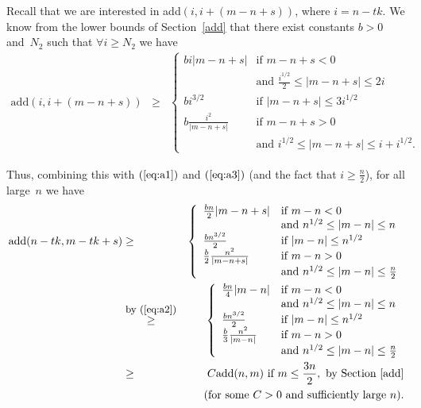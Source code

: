 \documentclass{article}
\newtheorem{Proof of Theorem}{Proof of Theorem}
\begin{document}
Recall that we are interested in add$(i,i+(m-n+s))$,
where $i=n-tk$.
We know from the lower bounds of Section~\ref{add} 
that there exist constants $b>0$ and~$N_{2}$ such that $\forall i \geq N_{2}$
we have
\begin{eqnarray*}
\textrm{add}(i,i\!+\!(m\!-\!n\!+\!s)) 
& \geq &
\left\{ \begin{array}{ll}
bi|m-n+s| & \textrm{if $m-n+s<0$} \\
& \textrm{and $\frac{i^{1/2}}{2} \leq |m-n+s| \leq 2i$} \\
bi^{3/2} & \textrm{if $|m-n+s| \leq 3i^{1/2}$} \\
b \frac{i^{2}}{|m-n+s|} & \textrm{if $m-n+s>0$} \\
& \textrm{and $i^{1/2} \leq |m-n+s| \leq i + i^{1/2}$}. 
\end{array} \right. 
\end{eqnarray*}
\phantom{p}

Thus, combining this with $(\ref{eq:a1})$ and $(\ref{eq:a3})$
(and the fact that $i \geq \frac{n}{2}$),
for all large~$n$ we have
\begin{eqnarray*}
\textrm{add}(n-tk,m-tk+s) 
& \geq &
\left\{ \begin{array}{ll}
\frac{bn}{2}|m-n+s| & \textrm{if $m-n<0$} \\
& \textrm{and $n^{1/2} \leq |m-n| \leq n$} \\
\frac{bn^{3/2}}{2} & \textrm{if $|m-n| \leq n^{1/2}$} \\
\frac{b}{2} \frac{n^{2}}{|m-n+s|} 
& \textrm{if $m-n>0$} \\
& \textrm{and $n^{1/2} \leq |m-n| \leq \frac{n}{2}$}
\end{array} \right. \\
& \stackrel{\textrm{\small{by (\ref{eq:a2})}}}{\geq} &
\left\{ \begin{array}{ll}
\frac{bn}{4}|m-n| & \textrm{if $m-n<0$} \\
& \textrm{and $n^{1/2} \leq |m-n| \leq n$} \\
\frac{bn^{3/2}}{2} & \textrm{if $|m-n| \leq n^{1/2}$} \\
\frac{b}{3} \frac{n^{2}}{|m-n|} 
& \textrm{if $m-n>0$} \\
& \textrm{and $n^{1/2} \leq |m-n| \leq \frac{n}{2}$} \\
\end{array} \right. \\
& \geq & C \textrm{add}(n,m) 
\textrm{ if } m \leq \frac{3n}{2}, 
\textrm{ by Section~\ref{add}} \\
& & \textrm{(for some } C>0 \textrm{ and sufficiently large } n). 
\end{eqnarray*} 
\phantom{p}
\end{document}

